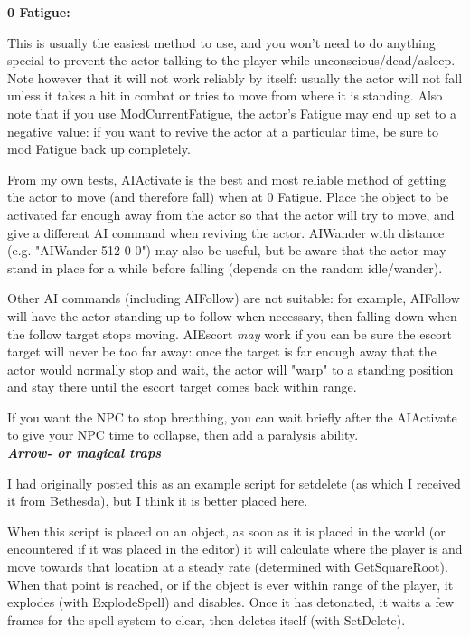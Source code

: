 \documentclass[
]{article}
\begin{document}
\textbf{0 Fatigue:}

This is usually the easiest method to use, and you won't need to do
anything special to prevent the actor talking to the player while
unconscious/dead/asleep. Note however that it will not work reliably by
itself: usually the actor will not fall unless it takes a hit in combat
or tries to move from where it is standing. Also note that if you use
ModCurrentFatigue, the actor's Fatigue may end up set to a negative
value: if you want to revive the actor at a particular time, be sure to
mod Fatigue back up completely.

From my own tests, AIActivate is the best and most reliable method of
getting the actor to move (and therefore fall) when at 0 Fatigue. Place
the object to be activated far enough away from the actor so that the
actor will try to move, and give a different AI command when reviving
the actor. AIWander with distance (e.g. "AIWander 512 0 0") may also be
useful, but be aware that the actor may stand in place for a while
before falling (depends on the random idle/wander).

Other AI commands (including AIFollow) are not suitable: for example,
AIFollow will have the actor standing up to follow when necessary, then
falling down when the follow target stops moving. AIEscort \emph{may}
work if you can be sure the escort target will never be too far away:
once the target is far enough away that the actor would normally stop
and wait, the actor will "warp" to a standing position and stay there
until the escort target comes back within range.

If you want the NPC to stop breathing, you can wait briefly after the
AIActivate to give your NPC time to collapse, then add a paralysis
ability.\\
\emph{\textbf{Arrow- or magical traps}}

I had originally posted this as an example script for setdelete (as
which I received it from Bethesda), but I think it is better placed
here.

When this script is placed on an object, as soon as it is placed in the
world (or encountered if it was placed in the editor) it will calculate
where the player is and move towards that location at a steady rate
(determined with GetSquareRoot). When that point is reached, or if the
object is ever within range of the player, it explodes (with
ExplodeSpell) and disables. Once it has detonated, it waits a few frames
for the spell system to clear, then deletes itself (with SetDelete).
\end{document}
